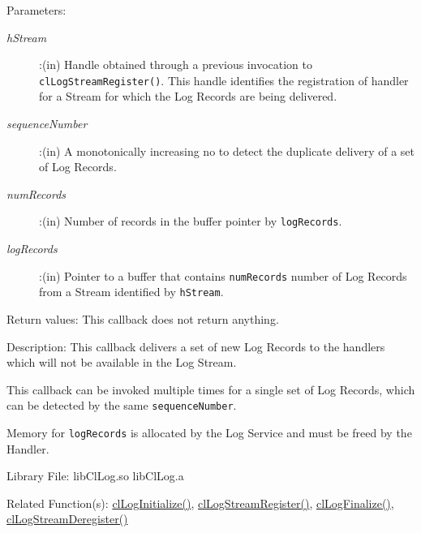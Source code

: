 \begin{flushleft}
\begin{Desc}
\begin{verbatim}
\end{verbatim}
\normalsize
\end{Desc}
\begin{Desc}
\item[Parameters:] 
\begin{description}
\item[{\em hStream}]:(in) Handle obtained through a previous invocation to {\tt{clLogStreamRegister()}}. This handle identifies the registration of handler 
for a Stream for which the Log Records are being delivered.
\item[{\em sequenceNumber}]:(in) A monotonically increasing no to detect the duplicate delivery of a set of Log Records.
\item[{\em numRecords}]:(in) Number of records in the buffer pointer by {\tt{logRecords}}.
\item[{\em *logRecords}]:(in) Pointer to a buffer that contains {\tt{numRecords}} number of Log Records from a Stream identified by 
{\tt{hStream}}.
\end{description}
\end{Desc}
\begin{Desc}
\item[Return values:]
This callback does not return anything.
\end{Desc}
\begin{Desc}
\item[Description:] This callback delivers a set of new Log Records to the handlers which will not be available in the Log Stream.
\par
This callback can be invoked multiple times for a single set of Log Records, which can be detected by the same {\tt{sequenceNumber}}.
\par
Memory for {\tt{logRecords}} is allocated by the Log Service and must be freed by the Handler.
\end{Desc}
\begin{Desc}
\item[Library File:] libClLog.so
\newline
libClLog.a
\end{Desc}
\begin{Desc}
\item[Related Function(s):]\hyperlink{pagelog101}{clLogInitialize()}, \hyperlink{pagelog112}{clLogStreamRegister()},
\hyperlink{pagelog102}{clLogFinalize()}, \hyperlink{pagelog115}{clLogStreamDeregister()}
\end{Desc}
\newpage





\end{flushleft}
